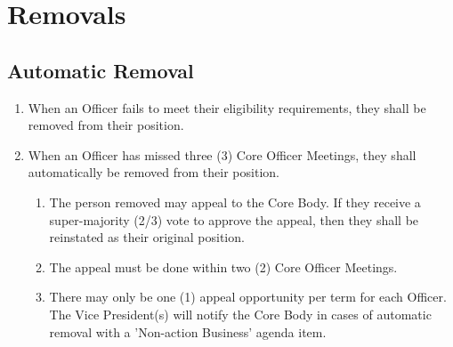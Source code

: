 \documentclass{article}
\newenvironment{li}{
\begin{enumerate}
  \setlength{\itemsep}{1pt}
  \setlength{\parskip}{0pt}
  \setlength{\parsep}{0pt}
}{\end{enumerate}}
\begin{document}
\section{Removals}
\subsection{Automatic Removal}
\begin{li}
\item When an Officer fails to meet their eligibility requirements, they shall be removed from their position.
\item When an Officer has missed three (3) Core Officer Meetings, they shall automatically be removed from their position.
	\begin{li}
	\item The person removed may appeal to the Core Body. If they receive a super-majority (2/3) vote to approve the appeal, then they shall be reinstated as their original position.
	\item The appeal must be done within two (2) Core Officer Meetings.
	\item There may only be one (1) appeal opportunity per term for each Officer. The Vice President(s) will notify the Core Body in cases of automatic removal with a 'Non-action Business' agenda item.
	\end{li}
\end{li}
\end{document}
